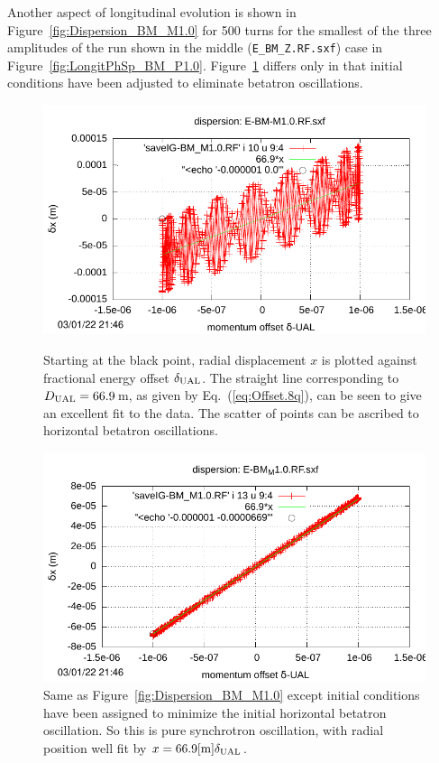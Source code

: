 \documentclass[]{article}
\begin{document}
Another aspect of longitudinal evolution is shown in 
Figure~\ref{fig:Dispersion_BM_M1.0} for 500
turns for the smallest of the three amplitudes
of the run shown in the middle ({\tt E\_BM\_Z.RF.sxf}) case in 
Figure~\ref{fig:LongitPhSp_BM_P1.0}. 
Figure~\ref{fig:Dispersion_BM_M1.0.2} differs only in that initial
conditions have been adjusted to eliminate betatron oscillations.

%
\begin{figure}[h]
\begin{minipage}[b]{\linewidth}
\centering
\includegraphics[scale=1.0]{pdf/BM-III_Figure9.pdf}
\caption{\label{fig:Dispersion_BM_M1.0}Starting at the black point, 
radial displacement $x$ is plotted against fractional energy offset 
$\delta_{\rm UAL}$. The straight line corresponding to 
$D_{\rm UAL}=66.9$\,m, as given by Eq.~(\ref{eq:Offset.8q}),
can be seen to give an excellent fit to the data. The scatter of points
can be ascribed to horizontal betatron oscillations.
}
\end{minipage}
\begin{minipage}[b]{\linewidth}
\centering
\includegraphics[scale=1.0]{pdf/BM-III_Figure10.pdf}
\caption{\label{fig:Dispersion_BM_M1.0.2}Same as 
Figure~\ref{fig:Dispersion_BM_M1.0} except initial conditions have
been assigned to minimize the initial horizontal betatron oscillation.
So this is pure synchrotron oscillation, with radial
position well fit by $x=66.9[{\rm m}]\delta_{\rm UAL}$.
}
\end{minipage}
\end{figure}
%
\end{document}
